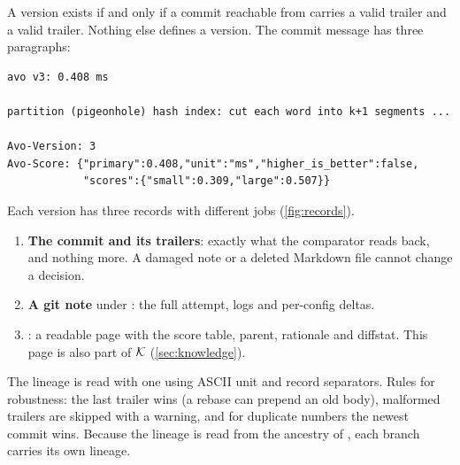 A version exists if and only if a commit reachable from  carries a valid
 trailer and a valid  trailer. Nothing else defines a version. The
commit message has three paragraphs:
\begin{lstlisting}
avo v3: 0.408 ms

partition (pigeonhole) hash index: cut each word into k+1 segments ...

Avo-Version: 3
Avo-Score: {"primary":0.408,"unit":"ms","higher_is_better":false,
            "scores":{"small":0.309,"large":0.507}}
\end{lstlisting}
Each version has three records with different jobs (\cref{fig:records}).
\begin{enumerate}[leftmargin=*,itemsep=1pt]
  \item \textbf{The commit and its trailers}: exactly what the comparator reads back, and nothing
    more. A damaged note or a deleted Markdown file cannot change a decision.
  \item \textbf{A git note} under : the full attempt, logs and per-config deltas.
  \item \textbf{}: a readable page with the score table, parent, rationale and
    diffstat. This page is also part of $\mathcal{K}$ (\cref{sec:knowledge}).
\end{enumerate}
The lineage is read with one  using ASCII unit and record separators. Rules for
robustness: the last trailer wins (a rebase can prepend an old body), malformed trailers are skipped
with a warning, and for duplicate numbers the newest commit wins. Because the lineage is read from
the ancestry of , each branch carries its own lineage.

